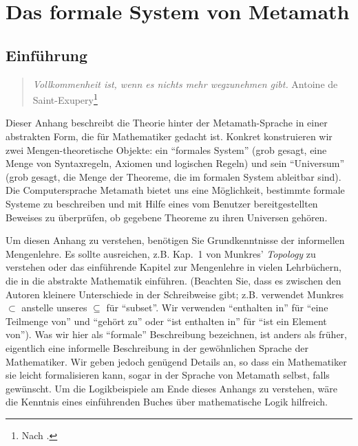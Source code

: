 \chapter{Das formale System von Metamath}\label{formalspec}

\section{Einführung}

\begin{quote}
  {\em Vollkommenheit ist, wenn es nichts mehr wegzunehmen gibt.}
    \flushright\sc Antoine de Saint-Exupery\footnote{Nach \cite[S.~3-25]{Campbell}.}\\
\end{quote}

Dieser Anhang beschreibt die Theorie hinter der Metamath-Sprache in einer abstrakten Form, die für Mathematiker gedacht ist.  Konkret konstruieren wir zwei Mengen-theoretische Objekte: ein "`formales System"' (grob gesagt, eine Menge von Syntaxregeln, Axiomen und logischen Regeln) und sein "`Universum"' (grob gesagt, die Menge der Theoreme, die im formalen System ableitbar sind).  Die Computersprache Metamath bietet uns eine Möglichkeit, bestimmte formale Systeme zu beschreiben und mit Hilfe eines vom Benutzer bereitgestellten Beweises zu überprüfen, ob gegebene Theoreme zu ihren Universen gehören.

Um diesen Anhang zu verstehen, benötigen Sie Grundkenntnisse der informellen Mengenlehre. Es sollte ausreichen, z.B. Kap.\ 1 von Munkres' {\em Topology} zu verstehen\cite{Munkres} oder das einführende Kapitel zur Mengenlehre in vielen Lehrbüchern, die in die abstrakte Mathematik einführen. (Beachten Sie, dass es zwischen den Autoren kleinere Unterschiede in der Schreibweise gibt; z.B. verwendet Munkres $\subset$ anstelle unseres $\subseteq$ für "`subset"'.  Wir verwenden "`enthalten in"' für "`eine Teilmenge von"' und "`gehört zu"' oder "`ist enthalten in"' für "`ist ein Element von"'). Was wir hier als "`formale"' Beschreibung bezeichnen, ist anders als früher, eigentlich eine informelle Beschreibung in der gewöhnlichen Sprache der Mathematiker.  Wir geben jedoch genügend Details an, so dass ein Mathematiker sie leicht formalisieren kann, sogar in der Sprache von Metamath selbst, falls gewünscht.  Um die Logikbeispiele am Ende dieses Anhangs zu verstehen, wäre die Kenntnis eines einführenden Buches über mathematische Logik hilfreich.

